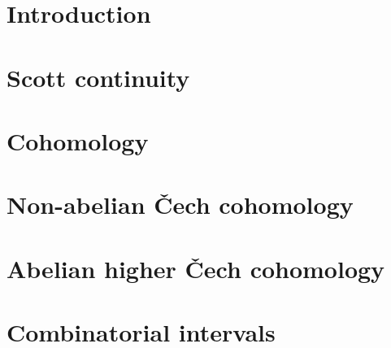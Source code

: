 \tableofcontents

\section{Introduction}


\section{Scott continuity}


\section{Cohomology}


\appendix
\section{Non-abelian \v{C}ech cohomology}\label{app-non-abelian-cech}

\section{Abelian higher \v{C}ech cohomology}\label{app-abelian-cech}

\section{Combinatorial intervals}

\printbibliography
